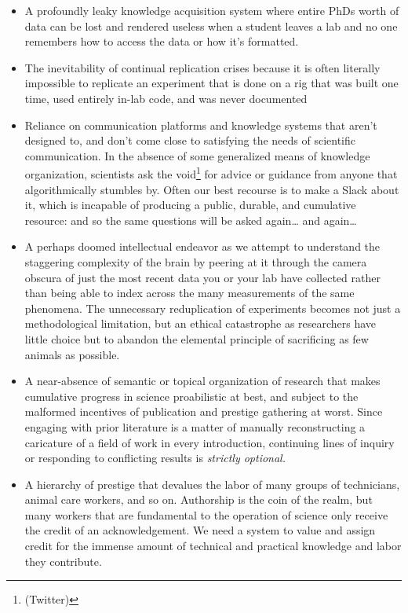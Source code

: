 \documentclass[10pt]{article}
\begin{document}
\begin{multicols}{2}
\begin{itemize}
\item
  A profoundly leaky knowledge acquisition system where entire PhDs
  worth of data can be lost and rendered useless when a student leaves a
  lab and no one remembers how to access the data or how it's formatted.
\item
  The inevitability of continual replication crises because it is often
  literally impossible to replicate an experiment that is done on a rig
  that was built one time, used entirely in-lab code, and was never
  documented
\item
  Reliance on communication platforms and knowledge systems that aren't
  designed to, and don't come close to satisfying the needs of
  scientific communication. In the absence of some generalized means of
  knowledge organization, scientists ask the void\footnote{(Twitter)}
  for advice or guidance from anyone that algorithmically stumbles by.
  Often our best recourse is to make a Slack about it, which is
  incapable of producing a public, durable, and cumulative resource: and
  so the same questions will be asked again\ldots{} and again\ldots{}
\item
  A perhaps doomed intellectual endeavor as we attempt to understand the staggering
  complexity of the brain by peering at it through the camera obscura of
  just the most recent data you or your lab have collected rather than
  being able to index across the many measurements of the same
  phenomena. The unnecessary reduplication of experiments becomes not
  just a methodological limitation, but an ethical catastrophe as
  researchers have little choice but to abandon the elemental principle
  of sacrificing as few animals as possible.
\item
  A near-absence of semantic or topical organization of research that
  makes cumulative progress in science proabilistic at best, and subject
  to the malformed incentives of publication and prestige gathering at
  worst. Since engaging with prior literature is a matter of manually
  reconstructing a caricature of a field of work in every introduction,
  continuing lines of inquiry or responding to conflicting results is
  \emph{strictly optional.}
\item
  A hierarchy of prestige that devalues the labor of many groups of
  technicians, animal care workers, and so on. Authorship is the coin of
  the realm, but many workers that are fundamental to the operation of
  science only receive the credit of an acknowledgement. We need a
  system to value and assign credit for the immense amount of technical
  and practical knowledge and labor they contribute.
\end{itemize}


\end{multicols}
\end{document}
